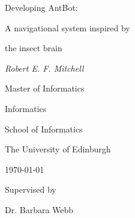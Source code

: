 \documentclass[a4paper,11pt,twoside,openright]{article}
\begin{document}
\centering
\vspace*{6cm}
        {\huge Developing AntBot: \par A navigational system inspired by \par the
          insect brain \par}
\vspace{1cm}
{\Large \textit{Robert E. F. Mitchell}}

\vspace{3cm}

{\large Master of Informatics \par}
{\large Informatics \par}
{\large School of Informatics \par}
{\large The University of Edinburgh \par}
\large \today \par

\vfill
Supervised by\par
Dr. Barbara Webb

\newpage
\thispagestyle{empty}
\mbox{}
\newpage
\end{document}
